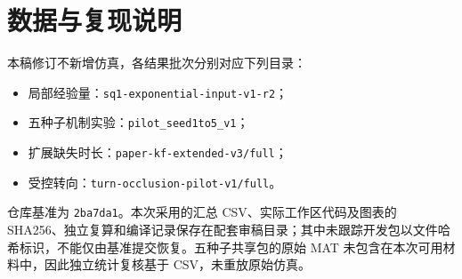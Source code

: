 \documentclass[UTF8,fontset=windows,11pt]{ctexart}
\begin{document}
\section*{数据与复现说明}
本稿修订不新增仿真，各结果批次分别对应下列目录：
\begin{itemize}[nosep,leftmargin=2em]
\item 局部经验量：\texttt{sq1-exponential-input-v1-r2}；
\item 五种子机制实验：\texttt{pilot\_seed1to5\_v1}；
\item 扩展缺失时长：\texttt{paper-kf-extended-v3/full}；
\item 受控转向：\texttt{turn-occlusion-pilot-v1/full}。
\end{itemize}
仓库基准为 \texttt{2ba7da1}。本次采用的汇总 CSV、实际工作区代码及图表的 SHA256、独立复算和编译记录保存在配套审稿目录；其中未跟踪开发包以文件哈希标识，不能仅由基准提交恢复。五种子共享包的原始 MAT 未包含在本次可用材料中，因此独立统计复核基于 CSV，未重放原始仿真。
\end{document}

